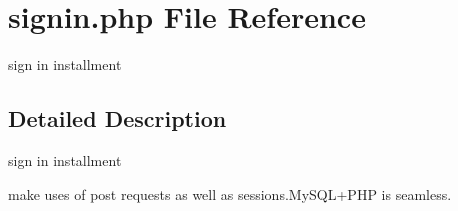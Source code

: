 \hypertarget{signin_8php}{}\section{signin.\+php File Reference}
\label{signin_8php}


sign in installment  




\subsection{Detailed Description}
sign in installment 

make uses of post requests as well as sessions.\+My\+S\+QL+\+P\+HP is seamless. 